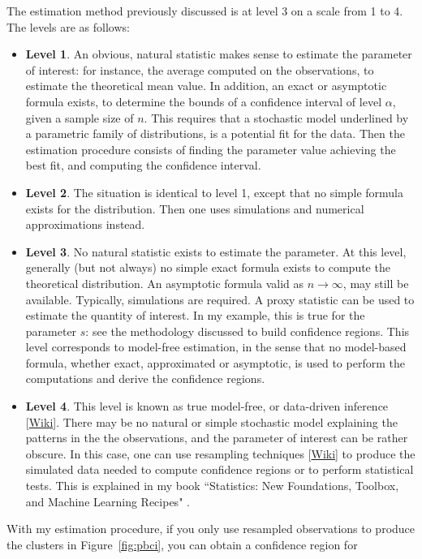 \documentclass[10pt]{article}
\begin{document}
\noindent The estimation method previously discussed is at level 3 on a scale from 1 to 4. The levels are as follows:
\begin{itemize}
\item {\bf Level 1}. An obvious, natural statistic makes sense to estimate the parameter of interest: for instance, the average computed on the observations, to estimate the theoretical mean value.  In addition, an exact or asymptotic formula exists, to determine the bounds of a confidence interval of level $\alpha$, given a sample size of $n$. This requires that a stochastic model underlined by a  parametric family of distributions, is a potential fit for the data. Then the estimation procedure consists of finding the parameter value achieving the best fit, and computing the confidence interval.
\item {\bf Level 2}. The situation is identical to level 1, except that no simple formula exists for the distribution. Then one uses simulations and numerical approximations instead.
\item {\bf Level 3}. No natural statistic exists to estimate the parameter. At this level, generally (but not always) no simple exact formula exists to compute the theoretical distribution. An asymptotic formula valid as $n\rightarrow\infty$, may still be available. Typically, simulations are required. A proxy statistic can be used to estimate the quantity of interest. In my example, this is true for the parameter $s$: see the methodology discussed to build confidence regions. This level corresponds to
model-free estimation, in the sense that no model-based formula, whether exact, approximated or asymptotic, is used to perform the computations and derive the confidence regions. 
\item {\bf Level 4}. This level is known as true \textcolor{index}{model-free}, or data-driven inference [\href{https://www.nature.com/articles/s41467-017-02288-4}{Wiki}].  There may be no natural or simple stochastic model explaining the patterns in the the observations, and the parameter of interest can be rather obscure. In this case, one can use \textcolor{index}{resampling} techniques [\href{https://en.wikipedia.org/wiki/Resampling_(statistics)}{Wiki}] to produce the simulated
data needed to compute confidence regions or to perform statistical tests. This is explained in my book ``Statistics: New Foundations, Toolbox, and Machine Learning Recipes" \cite{vgstats}. 
\end{itemize}
\noindent With my estimation procedure, if you only use resampled observations to produce the clusters in Figure~\ref{fig:pbci}, you can obtain a confidence region for 
\end{document}
